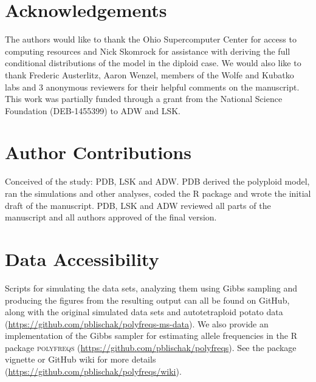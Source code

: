 \documentclass[11pt,english,letterpaper,oneside]{article}
\begin{document}
\section{Acknowledgements}           %

The authors would like to thank the Ohio Supercomputer Center for access to computing resources and Nick Skomrock for assistance with deriving the full conditional distributions of the model in the diploid case. We would also like to thank Frederic Austerlitz, Aaron Wenzel, members of the Wolfe and Kubatko labs and 3 anonymous reviewers for their helpful comments on the manuscript. This work was partially funded through a grant from the National Science Foundation (DEB-1455399) to ADW and LSK.
\medskip



\singlespacing





\section{Author Contributions}        %

Conceived of the study: PDB, LSK and ADW. PDB derived the polyploid model, ran the simulations and other analyses, coded the R package and wrote the initial draft of the manuscript. PDB, LSK and ADW reviewed all parts of the manuscript and all authors approved of the final version.
\medskip

\section{Data Accessibility}            %

Scripts for simulating the data sets, analyzing them using Gibbs sampling and producing the figures from the resulting output can all be found on GitHub, along with the original simulated data sets and autotetraploid potato data (\url{https://github.com/pblischak/polyfreqs-ms-data}). We also provide an implementation of the Gibbs sampler for estimating allele frequencies in the R package \textsc{polyfreqs} (\url{https://github.com/pblischak/polyfreqs}). See the package vignette or GitHub wiki for more details (\url{https://github.com/pblischak/polyfreqs/wiki}).
\end{document}
